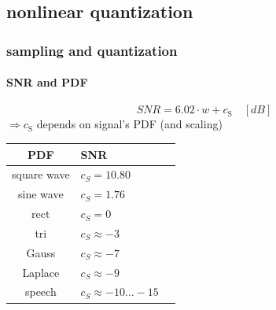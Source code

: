 \subsection{nonlinear quantization}	
\begin{frame}\frametitle{sampling and quantization}\framesubtitle{SNR and PDF}
		\begin{equation}
			SNR = 6.02\cdot w + c_{\mathrm{S}}\quad [dB]
		\end{equation}
		\pause
        \bigskip
		$\Rightarrow c_{\mathrm{S}}$ depends on signal's PDF (and scaling)
		\begin{table}
			\centering
			\begin{footnotesize}
				\begin{tabular}{clc}
				\hline
				\textbf{PDF} & \textbf{SNR}\\
				\hline
				square wave & $c_S =  10.80$\\
				sine wave & $c_S =  1.76$\\
				rect & $c_S =  0$\\
				tri & $c_S \approx  -3$\\
				Gauss & $c_S \approx  -7$\\
				Laplace & $c_S \approx  -9$\\
				speech & $c_S \approx  -10\ldots -15$\\
				\hline
				\end{tabular}
			\end{footnotesize}
		\end{table}
	\end{frame}	
